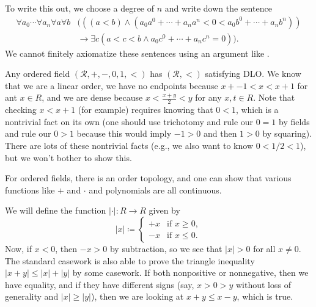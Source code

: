 \documentclass[../notes.tex]{subfiles}
\begin{document}
To write this out, we choose a degree of $n$ and write down the sentence
\begin{align*}
	\forall a_0\cdots\forall a_n\forall a\forall b&\big(\left((a<b)\land \left(a_0a^0+\cdots+a_na^n<0<a_0b^0+\cdots+a_nb^n\right)\right) \\
	&\to\exists c\left(a<c<b\land a_0c^0+\cdots+a_nc^n=0\right)\big).
\end{align*}
We cannot finitely axiomatize these sentences using an argument like .
\begin{remark}
	Any ordered field $(\mathcal R,+,-,0,1,<)$ has $(\mathcal R,<)$ satisfying $\mathrm{DLO}$. We know that we are a linear order, we have no endpoints because $x+-1<x<x+1$ for ant $x\in R$, and we are dense because $x<\frac{x+y}2<y$ for any $x,t\in R$. Note that checking $x<x+1$ (for example) requires knowing that $0<1$, which is a nontrivial fact on its own (one should use trichotomy and rule our $0=1$ by fields and rule our $0>1$ because this would imply $-1>0$ and then $1>0$ by squaring). There are lots of these nontrivial facts (e.g., we also want to know $0<1/2<1$), but we won't bother to show this.
\end{remark}
For ordered fields, there is an order topology, and one can show that various functions like $+$ and $\cdot$ and polynomials are all continuous.

We will define the function $\left|\cdot\right|\colon R\to R$ given by
\[\left|x\right|\coloneqq\begin{cases}
	+x & \text{if }x\ge0, \\
	-x & \text{if }x\le0.
\end{cases}\]
Now, if $x<0$, then $-x>0$ by subtraction, so we see that $\left|x\right|>0$ for all $x\ne0$. The standard casework is also able to prove the triangle inequality $\left|x+y\right|\le\left|x\right|+\left|y\right|$ by some casework. If both nonpositive or nonnegative, then we have equality, and if they have different signs (say, $x>0>y$ without loss of generality and $\left|x\right|\ge\left|y\right|$), then we are looking at $x+y\le x-y$, which is true.
\end{document}
